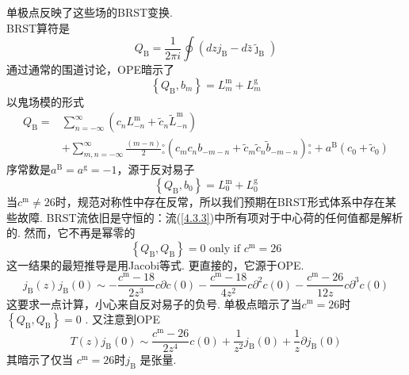 单极点反映了这些场的BRST变换.\\
BRST算符是
\begin{equation}
Q_{\mathrm{B}}=\frac{1}{2 \pi i} \oint\left(d z j_{\mathrm{B}}-d \bar{z} \tilde{\jmath}_{\mathrm{B}}\right)
\end{equation}
通过通常的围道讨论，OPE暗示了
\begin{equation}
\left\{Q_{\mathrm{B}}, b_{m}\right\}=L_{m}^{\mathrm{m}}+L_{m}^{\mathrm{g}}
\end{equation}
以鬼场模的形式
\begin{equation}\label{4.3.7}
\begin{aligned}
Q_{\mathrm{B}}=& \sum_{n=-\infty}^{\infty}\left(c_{n} L_{-n}^{\mathrm{m}}+\tilde{c}_{n} \tilde{L}_{-n}^{\mathrm{m}}\right) \\
&+\sum_{m, n=-\infty}^{\infty} \frac{(m-n)}{2} {}_\circ^\circ\left(c_{m} c_{n} b_{-m-n}+\tilde{c}_{m} \tilde{c}_{n} \tilde{b}_{-m-n}\right) {}_\circ^\circ+a^{\mathrm{B}}\left(c_{0}+\tilde{c}_{0}\right)
\end{aligned}
\end{equation}
序常数是$a^{\mathrm{B}}=a^{\mathrm{g}}=-1$，源于反对易子
\begin{equation}
\left\{Q_{\mathrm{B}}, b_{0}\right\}=L_{0}^{\mathrm{m}}+L_{0}^{\mathrm{g}}
\end{equation}
当$c^{\mathrm{m}} \neq 26$时，规范对称性中存在反常，所以我们预期在BRST形式体系中存在某些故障. BRST流依旧是守恒的：流(\ref{4.3.3})中所有项对于中心荷的任何值都是解析的. 然而，它不再是幂零的
\begin{equation}
\left\{Q_{\mathrm{B}}, Q_{\mathrm{B}}\right\}=0 \text { only if } c^{\mathrm{m}}=26
\end{equation}
这一结果的最短推导是用Jacobi等式. 更直接的，它源于OPE.
\begin{equation}
j_{\mathrm{B}}(z) j_{\mathrm{B}}(0) \sim-\frac{c^{\mathrm{m}}-18}{2 z^{3}} c \partial c(0)-\frac{c^{\mathrm{m}}-18}{4 z^{2}} c \partial^{2} c(0)-\frac{c^{\mathrm{m}}-26}{12 z} c \partial^{3} c(0)
\end{equation}
这要求一点计算，小心来自反对易子的负号. 单极点暗示了当$c^{\mathrm{m}}=26$时$\left\{Q_{\mathrm{B}}, Q_{\mathrm{B}}\right\}=0$ . 又注意到OPE 
\begin{equation}
T(z) j_{\mathrm{B}}(0) \sim \frac{c^{\mathrm{m}}-26}{2 z^{4}} c(0)+\frac{1}{z^{2}} j_{\mathrm{B}}(0)+\frac{1}{z} \partial j_{\mathrm{B}}(0)
\end{equation}
其暗示了仅当 $c^{\mathrm{m}}=26$时$j_{\mathrm{B}}$ 是张量.\\
